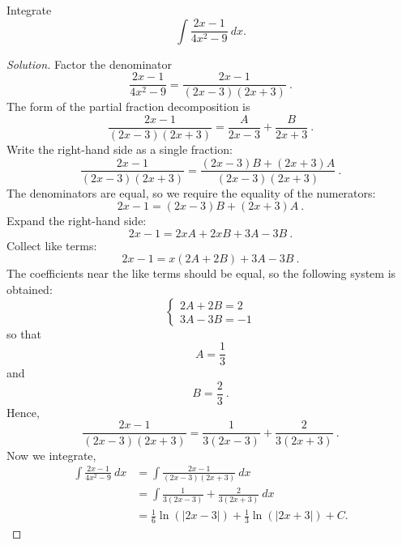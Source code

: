 \documentclass[compacto,10pt,comentarios]{aleph-notas}
\begin{document}
\begin{ejer}
    Integrate
    $$
        \int \frac{2x-1}{4x^2 - 9} ~ dx.
    $$
\end{ejer}
\begin{proof}[Solution]
    Factor the denominator
    $$
        \frac{2 x - 1}{4 x^{2} - 9}=\frac{2 x - 1}{\left(2 x - 3\right) \left(2 x + 3\right)} ~ .
    $$
    The form of the partial fraction decomposition is
    $$
        \frac{2 x - 1}{\left(2 x - 3\right) \left(2 x + 3\right)}=\frac{A}{2 x - 3}+\frac{B}{2 x + 3} ~ .
    $$
    Write the right-hand side as a single fraction:
    $$
        \frac{2 x - 1}{\left(2 x - 3\right) \left(2 x + 3\right)}=\frac{\left(2 x - 3\right) B + \left(2 x + 3\right) A}{\left(2 x - 3\right) \left(2 x + 3\right)} ~ .
    $$
    The denominators are equal, so we require the equality of the numerators:
    $$
        2 x - 1=\left(2 x - 3\right) B + \left(2 x + 3\right) A ~ .
    $$
    Expand the right-hand side:
    $$
        2 x - 1=2 x A + 2 x B + 3 A - 3 B ~ .
    $$
    Collect like terms:
    $$
        2 x - 1=x \left(2 A + 2 B\right) + 3 A - 3 B ~ .
    $$
    The coefficients near the like terms should be equal, so the following system is obtained:
    $$
        \begin{cases} 2 A + 2 B = 2\\3 A - 3 B = -1 \end{cases}
    $$
    so that 
    $$
        A = \frac{1}{3}
    $$
    and
    $$
        B = \frac{2}{3} ~ .
    $$
    Hence,
    $$
        \frac{2 x - 1}{\left(2 x - 3\right) \left(2 x + 3\right)}=\frac{1}{3(2 x - 3)}+\frac{2}{3(2 x + 3)} ~ .
    $$
    Now we integrate,
    \begin{align*}
        \int \frac{2x-1}{4x^2 - 9} ~ dx
        & = \int \frac{2 x - 1}{\left(2 x - 3\right) \left(2 x + 3\right)} ~ dx \\ 
        & = \int \frac{1}{3(2 x - 3)} + \frac{2}{3(2 x + 3)} ~ dx \\
        & = \frac{1}{6} \ln(|2x-3|) + \frac{1}{3} \ln(|2x + 3|) + C .
    \end{align*}
\end{proof}
\end{document}
